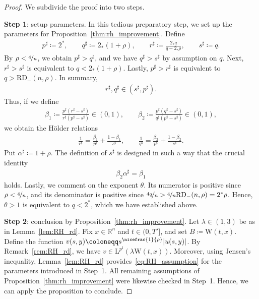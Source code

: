 \documentclass[11pt, leqno]{amsart}
\theoremstyle{definition}
\newcommand{\R}{\mathbb{R}}
\renewcommand{\L}{\mathrm{L}}
\newcommand{\WB}{\mathrm{W}}
\newcommand{\RD}{\mathrm{RD}}
\begin{document}
	\begin{proof}
		We subdivide the proof into two steps.

		\textbf{Step 1}: setup parameters. In this tedious preparatory step, we set up the parameters for Proposition~\ref{thm:rh_improvement}. Define
		\begin{align}
			p^\sharp \coloneqq 2^*, \qquad q^\sharp \coloneqq 2_*(1+\rho), \qquad r^\sharp \coloneqq \frac{2_* q}{q - 2_* \rho}, \qquad s^\sharp \coloneqq q.
		\end{align}
		By $\rho < \nicefrac{4}{n}$, we obtain $p^\sharp > q^\sharp$, and we have $q^\sharp > s^\sharp$ by assumption on $q$.
		{Next, $r^\sharp > s^\sharp$ is equivalent to $q < 2_* (1+\rho)$.
		Lastly, $p^\sharp > r^\sharp$ is equivalent to $q > \RD_{-}(n,\rho)$.}
		In summary,
		\begin{align}
			{r^\sharp, q^\sharp \in (s^\sharp, p^\sharp).}
		\end{align}
		Thus, if we define
		\begin{align}
			\beta_1 \coloneqq \frac{p^\sharp(r^\sharp - s^\sharp)}{r^\sharp(p^\sharp - s^\sharp)} \in (0,1), \qquad \beta_2 \coloneqq \frac{p^\sharp(q^\sharp - s^\sharp)}{q^\sharp(p^\sharp - s^\sharp)} \in (0,1),
		\end{align}
		we obtain the Hölder relations
		\begin{align}
			\frac{1}{r^\sharp} = \frac{\beta_1}{p^\sharp} + \frac{1-\beta_1}{s^\sharp}, \qquad \frac{1}{q^\sharp} = \frac{\beta_2}{p^\sharp} + \frac{1-\beta_2}{s^\sharp}.
		\end{align}
		Put $\alpha^\sharp \coloneqq 1 + \rho$. The definition of $s^\sharp$ is designed in such a way that the crucial identity
		\begin{align}
			\label{eq:beta_relation_rd}
			\beta_2 \alpha^\sharp = \beta_1
		\end{align}
		holds. Lastly, we comment on the exponent $\theta$. Its numerator is positive since $\rho < \nicefrac{4}{n}$, and its denominator is positive since $\nicefrac{4q}{n} > \nicefrac{4}{n} \RD_{-}(n,\rho) = 2^* \rho$. Hence, $\theta > 1$ is equivalent to $q < 2^*$, which we have established above.

		\textbf{Step 2}: conclusion by Proposition~\ref{thm:rh_improvement}. Let $\lambda \in (1,3)$ be as in Lemma~\ref{lem:RH_rd}. Fix $x \in \R^n$ and $t \in (0, T']$, and set $B \coloneqq \WB(t,x)$. Define the function $v(s,y) \coloneqq s^{\nicefrac{1}{\rho}} |u(s,y)|$. By Remark~\ref{rem:RH_rd}, we have $v \in \L^{p^\sharp}(\lambda\WB(t,x))$. Moreover, using Jensen's inequality, Lemma~\ref{lem:RH_rd} provides~\eqref{eq:RH_assumption} for the parameters introduced in Step~1. All remaining assumptions of Proposition~\ref{thm:rh_improvement} were likewise checked in Step~1. Hence, we can apply the proposition to conclude.
	\end{proof}
\end{document}
